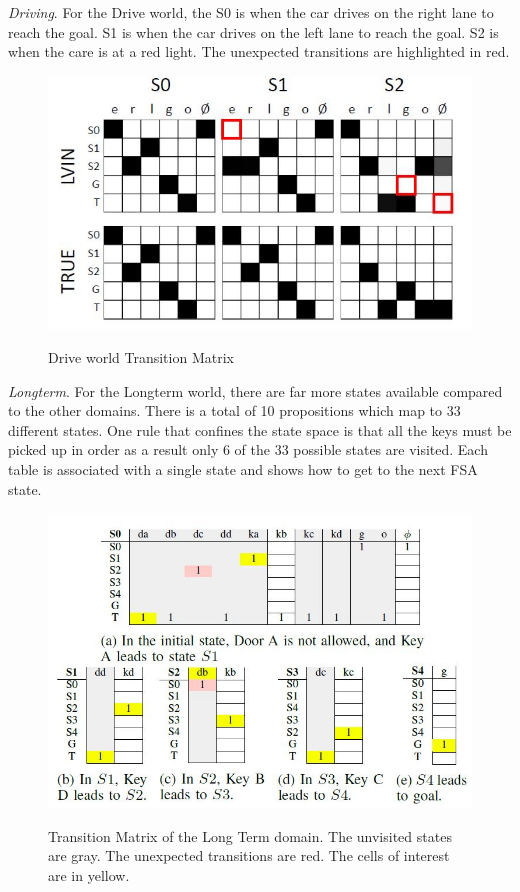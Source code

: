 \documentclass[letterpaper, 10 pt, conference]{ieeeconf}  %
\begin{document}
\textit{Driving}. For the Drive world, the S0 is when the car drives on the right lane to reach the goal. S1 is when the car drives on the left lane to reach the goal. S2 is when the care is at a red light. The unexpected transitions are highlighted in red.
\begin{figure}[h]
 \centering
 \includegraphics[scale=.5]{DrivingTM.JPG}\\
 \caption{Drive world Transition Matrix}
\end{figure}
\newline
\textit{Longterm}. For the Longterm world, there are far more states available compared to the other domains. There is a total of 10 propositions which map to 33 different states. One rule that confines the state space is that all the keys must be picked up in order as a result only 6 of the 33 possible states are visited. Each table is associated with a single state and shows how to get to the next FSA state.
\begin{figure}[h]
 \centering
 \includegraphics[scale=.45]{LongtermTM.JPG}\\
 \caption{Transition Matrix of the Long Term domain. The unvisited states are gray. The unexpected transitions are red. The cells of interest are in yellow.}
\end{figure}
\end{document}
